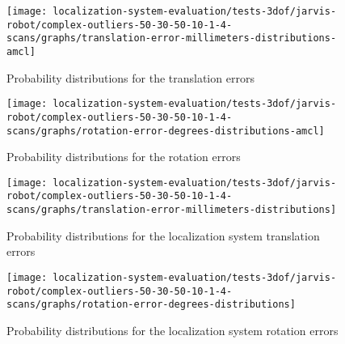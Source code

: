 \begin{figure}[H]
	\centering
	\begin{minipage}[H]{0.49\textwidth}
		\centering
		\texttt{[image: localization-system-evaluation/tests-3dof/jarvis-robot/complex-outliers-50-30-50-10-1-4-scans/graphs/translation-error-millimeters-distributions-amcl]}
		\caption{Probability distributions for the  translation errors}
		\label{fig:localization-system-evaluation_complex-path-with-outliers-50-30-50-10cm-per-sec-velocity-1-4-translation-error-amcl}
	\end{minipage}\hfill
	\begin{minipage}[H]{0.49\textwidth}
		\centering
		\texttt{[image: localization-system-evaluation/tests-3dof/jarvis-robot/complex-outliers-50-30-50-10-1-4-scans/graphs/rotation-error-degrees-distributions-amcl]}
		\caption{Probability distributions for the  rotation errors}
		\label{fig:localization-system-evaluation_complex-path-with-outliers-50-30-50-10cm-per-sec-velocity-1-4-rotation-error-amcl}
	\end{minipage}
\end{figure}

\begin{figure}[H]
	\centering
	\begin{minipage}[H]{0.49\textwidth}
		\centering
		\texttt{[image: localization-system-evaluation/tests-3dof/jarvis-robot/complex-outliers-50-30-50-10-1-4-scans/graphs/translation-error-millimeters-distributions]}
		\caption{Probability distributions for the localization system translation errors}
		\label{fig:localization-system-evaluation_complex-path-with-outliers-50-30-50-10cm-per-sec-velocity-1-4-translation-error}
	\end{minipage}\hfill
	\begin{minipage}[H]{0.49\textwidth}
		\centering
		\texttt{[image: localization-system-evaluation/tests-3dof/jarvis-robot/complex-outliers-50-30-50-10-1-4-scans/graphs/rotation-error-degrees-distributions]}
		\caption{Probability distributions for the localization system rotation errors}
		\label{fig:localization-system-evaluation_complex-path-with-outliers-50-30-50-10cm-per-sec-velocity-1-4-rotation-error}
	\end{minipage}
\end{figure}



